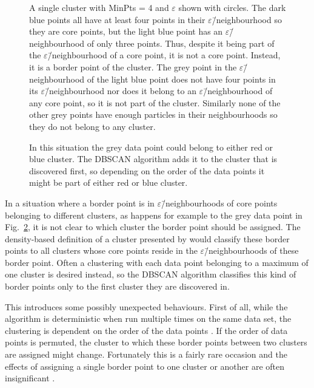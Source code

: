 \documentclass[english, twoside]{HYgradu}
\begin{document}
\begin{figure}
    \centering
    
    \caption{A single cluster with MinPts = 4 and $\varepsilon$ shown with circles. The dark blue points all have at least four points in their $\varepsilon$\=/neighbourhood so they are core points, but the light blue point has an $\varepsilon$\=/neighbourhood of only three points. Thus, despite it being part of the $\varepsilon$\=/neighbourhood of a core point, it is not a core point. Instead, it is a border point of the cluster. The grey point in the $\varepsilon$\=/neighbourhood of the light blue point does not have four points in its $\varepsilon$\=/neighbourhood nor does it belong to an $\varepsilon$\=/neighbourhood of any core point, so it is not part of the cluster. Similarly none of the other grey points have enough particles in their neighbourhoods so they do not belong to any cluster.}\label{fig:DBSCAN-borderpoint}
\end{figure}

\begin{figure}
    \centering
    
    \caption{In this situation the grey data point could belong to either red or blue cluster. The DBSCAN algorithm adds it to the cluster that is discovered first, so depending on the order of the data points it might be part of either red or blue cluster.}\label{fig:DBSCAN-ambiquity}
\end{figure}

In a situation where a border point is in $\varepsilon$\=/neighbourhoods of core points belonging to different clusters, as happens for example to the grey data point in Fig.\ \ref{fig:DBSCAN-ambiquity}, it is not clear to which cluster the border point should be assigned. The density-based definition of a cluster presented by \citet{ester1996density} would classify these border points to all clusters whose core points reside in the $\varepsilon$\=/neighbourhoods of these border point. Often a clustering with each data point belonging to a maximum of one cluster is desired instead, so the DBSCAN algorithm classifies this kind of border points only to the first cluster they are discovered in. 

This introduces some possibly unexpected behaviours. First of all, while the algorithm is deterministic when run multiple times on the same data set, the clustering is dependent on the order of the data points \citep{schubert2017dbscan}. If the order of data points is permuted, the cluster to which these border points between two clusters are assigned might change. Fortunately this is a fairly rare occasion and the effects of assigning a single border point to one cluster or another are often insignificant \citep{schubert2017dbscan}.
\end{document}
